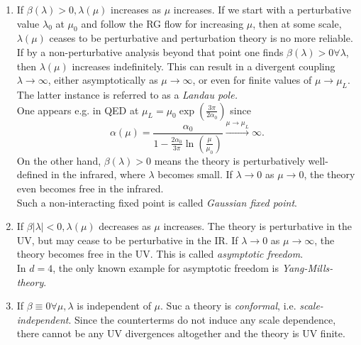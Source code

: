 \begin{enumerate}
	\item If $\beta(\lambda) >0,  \lambda(\mu)$ increases as $\mu$ increases. If we start with a perturbative value $\lambda_0$ at $\mu_0$ and follow the RG flow for increasing $\mu$, then at some scale, $\lambda(\mu)$ ceases to be perturbative and perturbation theory is no more reliable. If by a non-perturbative analysis beyond that point one finds $\beta(\lambda) >0 \forall \lambda$, then $\lambda(\mu)$ increases indefinitely. This can result in a divergent coupling $\lambda \rightarrow \infty$, either asymptotically as $\mu \rightarrow\infty$, or even for finite values of $\mu \rightarrow \mu_L$. The latter instance is referred to as a \emph{Landau pole.}\\
	One appears e.g. in QED at $\mu_L= \mu_0 \exp\left(\frac{3 \pi}{2 \alpha_0}\right)$ since
	\begin{equation}
		\alpha(\mu) = \frac{\alpha_0}{1-\frac{2\alpha_0}{3\pi} \ln(\frac{\mu}{\mu_0})} \stackrel{\mu \rightarrow \mu_L}{\rightarrow} \infty.
	\end{equation}
	On the other hand, $\beta(\lambda) >0$ means the theory is perturbatively well-defined in the infrared, where $\lambda$ becomes small. If $\lambda \rightarrow 0$ as $\mu \rightarrow 0$, the theory even becomes free in the infrared.\\
	Such a non-interacting fixed point is called \emph{Gaussian fixed point}.
	\item If $\beta |\lambda| < 0, \lambda(\mu)$ decreases as $ \mu$ increases. The theory is perturbative in the UV, but may cease to be perturbative in the IR. If $\lambda \rightarrow 0$ as $\mu \rightarrow \infty$, the theory becomes free in the UV. This is called \emph{asymptotic freedom}.\\
	In $d=4$, the only known example for asymptotic freedom is \emph{Yang-Mills-theory}.
	\item If $\beta \equiv 0 \forall \mu, \lambda$ is independent of $\mu$. Suc a theory is \emph{conformal}, i.e. \emph{scale-independent}. Since the counterterms do not induce any scale dependence, there cannot be any UV divergences altogether and the theory is UV finite.
\end{enumerate}


